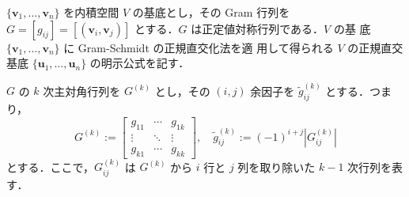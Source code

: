 \documentclass[11pt, uplatex, dvipdfmx]{jsarticle}
\theoremstyle{definition}
\begin{document}
$\{\bm{v}_1, \ldots, \bm{v}_n\}$ を内積空間 $V$ の基底とし，その Gram
行列を
$G = \left[ g_{ij} \right]= \left[ \left(\bm{v}_i, \bm{v}_j
  \right)\right]$ とする．$G$ は正定値対称行列である．$V$ の基
底 $\{\bm{v}_1, \ldots, \bm{v}_n\}$ に Gram-Schmidt の正規直交化法を適
用して得られる $V$ の正規直交基底 $\{\bm{u}_1, \ldots, \bm{u}_n\}$ の明示公式を記す．

$G$ の $k$ 次主対角行列を $G^{(k)}$ とし，その $(i,j)$ 余因子を $\tilde{g}^{(k)}_{ij}$ とする．つまり，
\[
  G^{(k)} := \left[
    \begin{array}{ccc}
      g_{11} & \cdots & g_{1k}\\
      \vdots & \ddots & \vdots\\
      g_{k1} & \cdots & g_{kk}
    \end{array}
  \right], \quad \tilde{g}^{(k)}_{ij} := (-1)^{i+j} \left|G^{(k)}_{ij}\right|
\]
とする．ここで，$G^{(k)}_{ij}$ は $G^{(k)}$ から $i$ 行と $j$ 列を取り除いた $k-1$ 次行列を表す．
\end{document}
